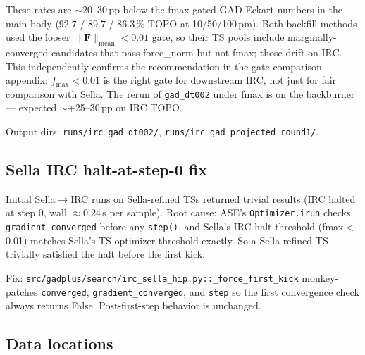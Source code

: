 \documentclass[11pt]{article}
\begin{document}
These rates are $\sim$20--30\,pp below the fmax-gated GAD Eckart numbers
in the main body (92.7 / 89.7 / 86.3\,\% TOPO at 10/50/100\,pm). Both
backfill methods used the looser $\|\mathbf{F}\|_{\text{mean}}{<}0.01$
gate, so their TS pools include marginally-converged candidates that
pass force\_norm but not fmax; those drift on IRC. This independently
confirms the recommendation in the gate-comparison appendix:
$f_{\max}{<}0.01$ is the right gate for downstream IRC, not just for
fair comparison with Sella. The rerun of \texttt{gad\_dt002} under fmax
is on the backburner --- expected $\sim$+25--30\,pp on IRC TOPO.

Output dirs: \texttt{runs/irc\_gad\_dt002/},
\texttt{runs/irc\_gad\_projected\_round1/}.

\clearpage
\subsection{Sella IRC halt-at-step-0 fix}

Initial Sella$\to$IRC runs on Sella-refined TSs returned trivial
results (IRC halted at step 0, wall $\approx$0.24\,s per sample). Root
cause: ASE's \texttt{Optimizer.irun} checks \texttt{gradient\_converged}
before any \texttt{step()}, and Sella's IRC halt threshold (fmax$<$0.01)
matches Sella's TS optimizer threshold exactly. So a Sella-refined TS
trivially satisfied the halt before the first kick.

Fix: \texttt{src/gadplus/search/irc\_sella\_hip.py::\_force\_first\_kick}
monkey-patches \texttt{converged}, \texttt{gradient\_converged}, and
\texttt{step} so the first convergence check always returns False.
Post-first-step behavior is unchanged.

\subsection{Data locations}
\end{document}
